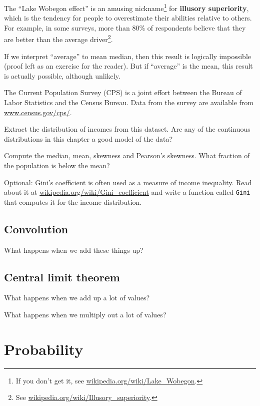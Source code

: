 \documentclass[10pt]{book}
\begin{document}
\begin{ex}

The ``Lake Wobegon effect'' is an amusing nickname\footnote{If you
  don't get it, see \url{wikipedia.org/wiki/Lake_Wobegon}.} for {\bf
  illusory superiority}, which is the tendency for people to
overestimate their abilities relative to others.  For example, in some
surveys, more than 80\% of respondents believe that they are better
than the average driver\footnote{See
  \url{wikipedia.org/wiki/Illusory_superiority}.}.

If we interpret ``average'' to mean median, then this result is
logically impossible (proof left as an exercise for the reader).
But if ``average'' is the mean, this result is actually possible,
although unlikely. 

The Current Population Survey (CPS) is a joint effort between the
Bureau of Labor Statistics and the Census Bureau.  Data from the
survey are available from \url{www.census.gov/cps/}.

Extract the distribution of incomes from this dataset.  Are any of
the continuous distributions in this chapter a good model of
the data?

Compute the median, mean, skewness and Pearson's skewness.  What
fraction of the population is below the mean?

Optional: Gini's coefficient is often used as a measure of income
inequality.  Read about it at
\url{wikipedia.org/wiki/Gini_coefficient} and write a function called
    {\tt Gini} that computes it for the income distribution.

\end{ex}


\section{Convolution}

What happens when we add these things up?

\section{Central limit theorem}

What happens when we add up a lot of values?

What happens when we multiply out a lot of values?


\chapter{Probability}
\end{document}
